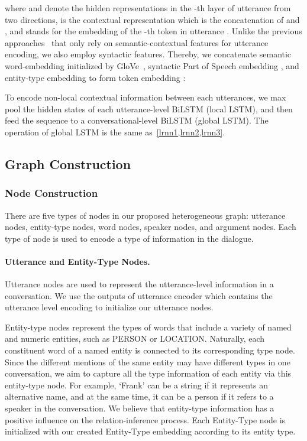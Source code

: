 \documentclass[letterpaper]{article} \usepackage{aaai21}  \usepackage{times}  \usepackage{helvet} \usepackage{courier}  \usepackage[hyphens]{url}  \usepackage{graphicx} \urlstyle{rm} \def\UrlFont{\rm}  \usepackage{natbib}  \usepackage{caption} \frenchspacing  \setlength{\pdfpagewidth}{8.5in}  \setlength{\pdfpageheight}{11in}
\begin{document}
where  and  denote the hidden representations in the -th layer of utterance  from two directions,  is the contextual representation which is the concatenation of  and , and  stands for the embedding of the -th token in utterance . Unlike the previous approaches~\cite{christopoulou2019connecting} that only rely on semantic-contextual features for utterance encoding, we also employ syntactic features. Thereby, we concatenate semantic word-embedding  initialized by GloVe~\cite{pennington2014glove}, syntactic Part of Speech embedding , and entity-type embedding  to form token embedding :


To encode non-local contextual information between each utterances, we max pool the hidden states of each utterance-level BiLSTM (local LSTM), and then feed the sequence  to a conversational-level BiLSTM (global LSTM). The operation of global LSTM is the same as~\cref{lrnn1,lrnn2,lrnn3}.




\subsection{Graph Construction}

\subsubsection{Node Construction}

There are five types of nodes in our proposed heterogeneous graph: utterance nodes, entity-type nodes, word nodes, speaker nodes, and argument nodes. Each type of node is used to encode a type of information in the dialogue.


\paragraph{Utterance and Entity-Type Nodes.}
Utterance nodes are used to represent the utterance-level information in a conversation.
We use the outputs of utterance encoder which contains the utterance level encoding to initialize our utterance nodes.

Entity-type nodes represent the types of words that include a variety of named and numeric entities, such as PERSON or LOCATION.
Naturally, each constituent word of a named entity is connected to its corresponding type node.
Since the different mentions of the same entity may have different types in one conversation, we aim to capture all the type information of each entity via this entity-type node. For example, `Frank' can be a string if it represents an alternative name, and at the same time, it can be a person if it refers to a speaker in the conversation. We believe that entity-type information has a positive influence on the relation-inference process. Each Entity-Type node is initialized with our created Entity-Type embedding according to its entity type.
\end{document}
